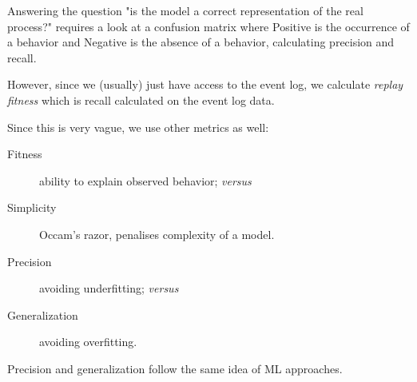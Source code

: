Answering the question "is the model a correct representation of the real process?" requires a
look at a confusion matrix where Positive is the occurrence of a behavior and Negative is the absence of a behavior, calculating precision and recall.

However, since we (usually) just have access to the event log, we calculate \emph{replay fitness} which is recall calculated on the event log data.

Since this is very vague, we use other metrics as well:

\begin{description}
	\item[Fitness] ability to explain observed behavior; \emph{versus}
	\item[Simplicity] Occam's razor, penalises complexity of a model.
	\item[Precision] avoiding underfitting; \emph{versus}
	\item[Generalization] avoiding overfitting.
\end{description}

Precision and generalization follow the same idea of ML approaches.
